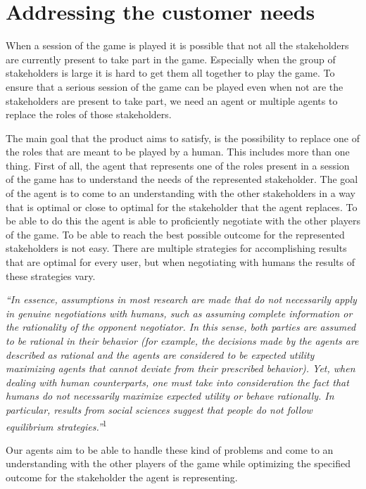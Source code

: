 \section{Addressing the customer needs}
When a session of the game is played it is possible that not all the stakeholders are currently present to take part in the game. Especially when the group of stakeholders is large it is hard to get them all together to play the game. To ensure that a serious session of the game can be played even when not are the stakeholders are present to take part, we need an agent or multiple agents to replace the roles of those stakeholders. 
\par
The main goal that the product aims to satisfy, is the possibility to replace one of the roles that are meant to be played by a human. This includes more than one thing. First of all, the agent that represents one of the roles present in a session of the game has to understand the needs of the represented stakeholder. The goal of the agent is to come to an understanding with the other stakeholders in a way that is optimal or close to optimal for the stakeholder that the agent replaces. To be able to do this the agent is able to proficiently negotiate with the other players of the game. To be able to reach the best possible outcome for the represented stakeholders is not easy. There are multiple strategies for accomplishing results that are optimal for every user, but when negotiating with humans the results of these strategies vary.

\par
\textit{ “In essence, assumptions in most research are made that do not necessarily apply in genuine negotiations with humans, such as assuming complete information or the rationality of the opponent negotiator. In this sense, both parties are assumed to be rational in their behavior (for example, the decisions made by the agents are described as rational and the agents are considered to be expected utility maximizing agents that cannot deviate from their prescribed behavior). Yet, when dealing with human counterparts, one must take into consideration the fact that humans do not necessarily maximize expected utility or behave rationally. In particular, results from social sciences suggest that people do not follow equilibrium strategies.”}\textsuperscript{1}

\par
Our agents aim to be able to handle these kind of problems and come to an understanding with the other players of the game while optimizing the specified outcome for the stakeholder the agent is representing.
